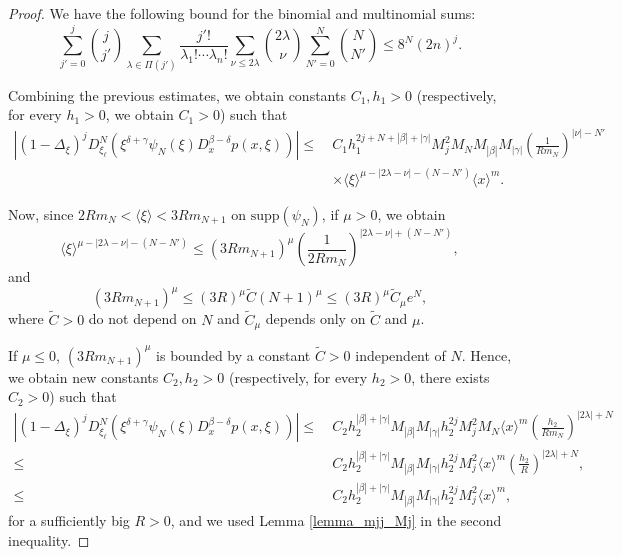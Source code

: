 \documentclass[11pt,reqno]{amsart}
\numberwithin{equation}{section}
\begin{document}
\begin{proof}
	We have the following bound for the binomial and multinomial sums:
	\begin{equation}
		\sum_{j'=0}^j\binom{j}{j'}\sum_{\lambda\in\Pi(j')}\frac{j'!}{\lambda_1!\cdots\lambda_n!}\sum_{\nu\leq 2\lambda}\binom{2\lambda}{\nu}\sum_{N'=0}^N\binom{N}{N'} \leq 8^N(2n)^j.
	\end{equation}
	
	Combining the previous estimates, we obtain constants $C_1,h_1>0$ (respectively, for every $h_1>0$, we obtain $C_1>0$) such that
	\begin{align*}
		\left| (1-\Delta_\xi)^j D_{\xi_\ell}^N\left(\xi^{\delta+\gamma}\psi_N(\xi) D_x^{\beta-\delta}p(x,\xi)\right) \right| \leq\ & C_1h_1^{2j+N+|\beta|+|\gamma|}M_{j}^2M_NM_{|\beta|}M_{|\gamma|}\left(\frac{1}{Rm_N}\right)^{|\nu|-N'}\\
		& \times \langle\xi\rangle^{\mu - |2\lambda-\nu|-(N-N')} \langle x\rangle^{m}.
	\end{align*}
	
	Now, since $2Rm_N < \langle\xi\rangle < 3Rm_{N+1}$ on $\mathrm{supp}(\psi_N)$, if $\mu> 0$, we obtain
	\begin{equation*}
		\langle\xi\rangle^{\mu - |2\lambda-\nu|-(N-N')} \leq (3Rm_{N+1})^{\mu}\left(\frac{1}{2Rm_N}\right)^{|2\lambda-\nu|+(N-N')},
	\end{equation*}
	and
	\[(3Rm_{N+1})^{\mu} \leq (3R)^{\mu}\tilde{C}(N+1)^{\mu} \leq (3R)^{\mu}\tilde{C}_{\mu}e^N,\]
	where $\tilde{C}>0$ do not depend on $N$ and $\tilde{C}_{\mu}$ depends only on $\tilde{C}$ and $\mu$.
	
	If $\mu\leq 0$, $(3Rm_{N+1})^{\mu}$ is bounded by a constant $\tilde{C}>0$ independent of $N$. Hence, we obtain new constants $C_2,h_2>0$ (respectively, for every $h_2>0$, there exists $C_2>0$) such that
	\begin{align*}
		\left| (1-\Delta_\xi)^j D_{\xi_\ell}^N\left(\xi^{\delta+\gamma}\psi_N(\xi) D_x^{\beta-\delta}p(x,\xi)\right) \right| \leq\ & C_2 h_2^{|\beta|+|\gamma|}M_{|\beta|}M_{|\gamma|}h_2^{2j}M_{j}^2M_N \langle x\rangle^{m}  \left(\frac{h_2}{Rm_N}\right)^{|2\lambda|+N}\\
		\leq\ & C_2 h_2^{|\beta|+|\gamma|}M_{|\beta|}M_{|\gamma|}h_2^{2j}M_{j}^2 \langle x\rangle^{m} \left(\frac{h_2}{R}\right)^{|2\lambda|+N},\\
		\leq\ & C_2 h_2^{|\beta|+|\gamma|}M_{|\beta|}M_{|\gamma|}h_2^{2j}M_{j}^2 \langle x\rangle^{m},
	\end{align*}
	for a sufficiently big $R>0$, and we used Lemma \ref{lemma_mjj_Mj} in the second inequality.
	

\end{proof}
\end{document}

